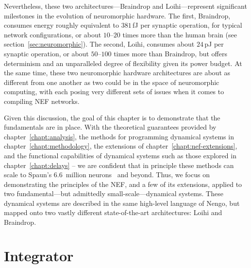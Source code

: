 Nevertheless, these two architectures---Braindrop and Loihi---represent significant milestones in the evolution of neuromorphic hardware.
The first, Braindrop, consumes energy roughly equivalent to $381$\,fJ per synaptic operation, for typical network configurations, or about $10$--$20$ times more than the human brain (see section~\ref{sec:neuromorphic}).
The second, Loihi, consumes about $24$\,pJ per synaptic operation, or about $50$--$100$ times more than Braindrop, but offers determinism and an unparalleled degree of flexibility given its power budget.
At the same time, these two neuromorphic hardware architectures are about as different from one another as two could be in the space of neuromorphic computing, with each posing very different sets of issues when it comes to compiling NEF networks.

Given this discussion, the goal of this chapter is to demonstrate that the fundamentals are in place.
With the theoretical guarantees provided by chapter~\ref{chapt:analysis}, the methods for programming dynamical systems in chapter~\ref{chapt:methodology}, the extensions of chapter~\ref{chapt:nef-extensions}, and the functional capabilities of dynamical systems such as those explored in chapter~\ref{chapt:delays} -- we are confident that in principle these methods can scale to Spaun's 6.6~million neurons~\citep{choo2018} and beyond.
Thus, we focus on demonstrating the principles of the NEF, and a few of its extensions, applied to two fundamental---but admittedly small-scale---dynamical systems.
These dynamical systems are described in the same high-level language of Nengo, but mapped onto two vastly different state-of-the-art architectures: Loihi and Braindrop.

\section{Integrator}
\label{sec:integrator}

